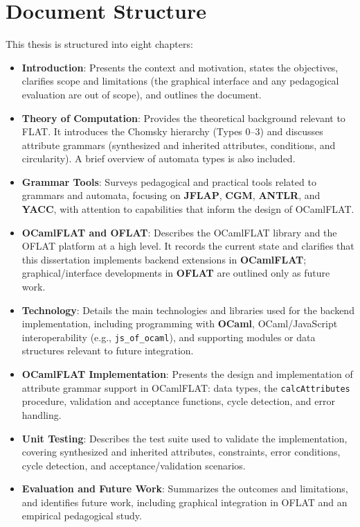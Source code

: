 \section{Document Structure}
\label{sec:document_structure}

This thesis is structured into eight chapters:

\begin{itemize}
  \item \textbf{Introduction}: Presents the context and motivation, states the objectives, clarifies scope and limitations (the graphical interface and any pedagogical evaluation are out of scope), and outlines the document.

  \item \textbf{Theory of Computation}: Provides the theoretical background relevant to FLAT. It introduces the Chomsky hierarchy (Types 0--3) and discusses attribute grammars (synthesized and inherited attributes, conditions, and circularity). A brief overview of automata types is also included.

  \item \textbf{Grammar Tools}: Surveys pedagogical and practical tools related to grammars and automata, focusing on \textbf{JFLAP}, \textbf{CGM}, \textbf{ANTLR}, and \textbf{YACC}, with attention to capabilities that inform the design of OCamlFLAT.

  \item \textbf{OCamlFLAT and OFLAT}: Describes the OCamlFLAT library and the OFLAT platform at a high level. It records the current state and clarifies that this dissertation implements backend extensions in \textbf{OCamlFLAT}; graphical/interface developments in \textbf{OFLAT} are outlined only as future work.

  \item \textbf{Technology}: Details the main technologies and libraries used for the backend implementation, including programming with \textbf{OCaml}, OCaml/JavaScript interoperability (e.g., \texttt{js\_of\_ocaml}), and supporting modules or data structures relevant to future integration.

  \item \textbf{OCamlFLAT Implementation}: Presents the design and implementation of attribute grammar support in OCamlFLAT: data types, the \texttt{calcAttributes} procedure, validation and acceptance functions, cycle detection, and error handling.

  \item \textbf{Unit Testing}: Describes the test suite used to validate the implementation, covering synthesized and inherited attributes, constraints, error conditions, cycle detection, and acceptance/validation scenarios.

  \item \textbf{Evaluation and Future Work}: Summarizes the outcomes and limitations, and identifies future work, including graphical integration in OFLAT and an empirical pedagogical study.
\end{itemize}

